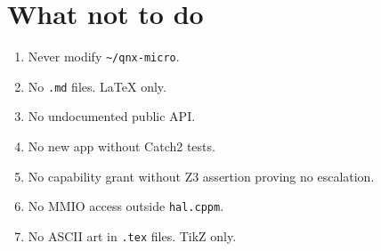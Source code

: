 \documentclass[11pt]{article}
\begin{document}
\section{What not to do}

\begin{enumerate}[leftmargin=2em]
\item Never modify \texttt{\textasciitilde/qnx-micro}.
\item No \texttt{.md} files.  LaTeX only.
\item No undocumented public API.
\item No new app without Catch2 tests.
\item No capability grant without Z3 assertion proving no escalation.
\item No MMIO access outside \texttt{hal.cppm}.
\item No ASCII art in \texttt{.tex} files.  TikZ only.
\end{enumerate}
\end{document}
